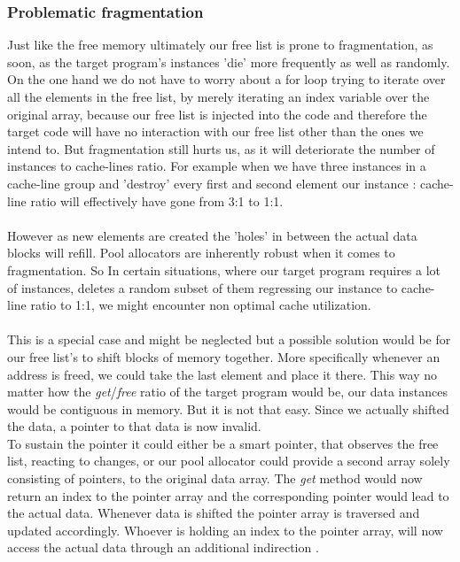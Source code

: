 \subsubsection{Problematic fragmentation}
Just like the free memory ultimately our free list is prone to fragmentation, as soon, as the target program's instances 'die' more frequently as well as randomly. On the one hand we do not have to worry about a for loop trying to iterate over all the elements in the free list, by merely iterating an index variable over the original array, because our free list is injected into the code and therefore the target code will have no interaction with our free list other than the ones we intend to. But fragmentation still hurts us, as it will deteriorate the number of instances to cache-lines ratio. For example when we have three instances in a cache-line group and 'destroy' every first and second element our instance : cache-line ratio will effectively have gone from 3:1 to 1:1.\\\\
However as new elements are created the 'holes' in between the actual data blocks will refill. Pool allocators are inherently robust when it comes to fragmentation. So In certain situations, where our target program requires a lot of instances, deletes a random subset of them regressing our instance to cache-line ratio to 1:1, we might encounter non optimal cache utilization.\\\\
This is a special case and might be neglected but a possible solution would be for our free list's to shift blocks of memory together. More specifically whenever an address is freed, we could take the last element and place it there. This way no matter how the \textit{get}/\textit{free} ratio of the target program would be, our data instances would be contiguous in memory. But it is not that easy. Since we actually shifted the data, a pointer to that data is now invalid.\\
To sustain the pointer it could either be a smart pointer, that observes the free list, reacting to changes, or our pool allocator could provide a second array solely consisting of pointers, to the original data array. The \textit{get} method would now return an index to the pointer array and the corresponding pointer would lead to the actual data. Whenever data is shifted the pointer array is traversed and updated accordingly. Whoever is holding an index to the pointer array, will now access the actual data through an additional indirection .\\
